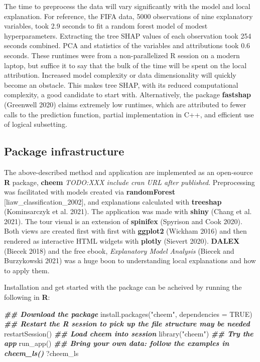 \documentclass[
  article]{article}
\newenvironment{Shaded}{\begin{snugshade}}{\end{snugshade}}
\newcommand{\AttributeTok}[1]{\textcolor[rgb]{0.77,0.63,0.00}{#1}}
\newcommand{\ConstantTok}[1]{\textcolor[rgb]{0.00,0.00,0.00}{#1}}
\newcommand{\DocumentationTok}[1]{\textcolor[rgb]{0.56,0.35,0.01}{\textbf{\textit{#1}}}}
\newcommand{\FunctionTok}[1]{\textcolor[rgb]{0.00,0.00,0.00}{#1}}
\newcommand{\NormalTok}[1]{#1}
\newcommand{\StringTok}[1]{\textcolor[rgb]{0.31,0.60,0.02}{#1}}
\begin{document}
The time to preprocess the data will vary significantly with the model and local explanation. For reference, the FIFA data, 5000 observations of nine explanatory variables, took 2.9 seconds to fit a random forest model of modest hyperparameters. Extracting the tree SHAP values of each observation took 254 seconds combined. PCA and statistics of the variables and attributions took 0.6 seconds. These runtimes were from a non-parallelized R session on a modern laptop, but suffice it to say that the bulk of the time will be spent on the local attribution. Increased model complexity or data dimensionality will quickly become an obstacle. This makes tree SHAP, with its reduced computational complexity, a good candidate to start with. Alternatively, the package \textbf{fastshap} (Greenwell 2020) claims extremely low runtimes, which are attributed to fewer calls to the prediction function, partial implementation in C++, and efficient use of logical subsetting.

\hypertarget{sec:infrastructure}{%
\subsection{Package infrastructure}\label{sec:infrastructure}}

The above-described method and application are implemented as an open-source \textbf{R} package, \textbf{cheem} \emph{TODO:XXX include cran URL after published}. Preprocessing was facilitated with models created via \textbf{randomForest} {[}liaw\_classification\_2002{]}, and explanations calculated with \textbf{treeshap} (Kominsarczyk et al. 2021). The application was made with \textbf{shiny} (Chang et al. 2021). The tour visual is an extension of \textbf{spinifex} (Spyrison and Cook 2020). Both views are created first with first with \textbf{ggplot2} (Wickham 2016) and then rendered as interactive HTML widgets with \textbf{plotly} (Sievert 2020). \textbf{DALEX} (Biecek 2018) and the free ebook, \emph{Explanatory Model Analysis} (Biecek and Burzykowski 2021) was a huge boon to understanding local explanations and how to apply them.

Installation and get started with the package can be acheived by running the following in \textbf{R}:

\begin{Shaded}
\begin{Highlighting}[]
\DocumentationTok{\#\# Download the package}
\FunctionTok{install.packages}\NormalTok{(}\StringTok{"cheem"}\NormalTok{, }\AttributeTok{dependencies =} \ConstantTok{TRUE}\NormalTok{)}
\DocumentationTok{\#\# Restart the R session to pick up the file structure may be needed}
\FunctionTok{restartSession}\NormalTok{()}
\DocumentationTok{\#\# Load cheem into session}
\FunctionTok{library}\NormalTok{(}\StringTok{"cheem"}\NormalTok{)}
\DocumentationTok{\#\# Try the app}
\FunctionTok{run\_app}\NormalTok{()}
\DocumentationTok{\#\# Bring your own data: follow the examples in cheem\_ls()}
\NormalTok{?cheem\_ls}
\end{Highlighting}
\end{Shaded}
\end{document}
